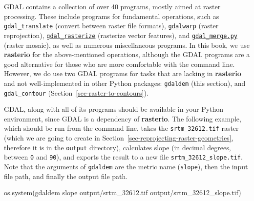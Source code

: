 \documentclass[
  letterpaper,
]{krantz}
\newenvironment{Shaded}{\begin{snugshade}}{\end{snugshade}}
\newcommand{\NormalTok}[1]{\textcolor[rgb]{0.00,0.23,0.31}{#1}}
\newcommand{\StringTok}[1]{\textcolor[rgb]{0.13,0.47,0.30}{#1}}
\begin{document}
\begin{tcolorbox}[enhanced jigsaw, title=\textcolor{quarto-callout-note-color}{\faInfo}\hspace{0.5em}{Note}, arc=.35mm, toprule=.15mm, titlerule=0mm, colframe=quarto-callout-note-color-frame, breakable, toptitle=1mm, bottomtitle=1mm, rightrule=.15mm, colbacktitle=quarto-callout-note-color!10!white, leftrule=.75mm, left=2mm, bottomrule=.15mm, opacityback=0, coltitle=black, opacitybacktitle=0.6, colback=white]

GDAL contains a collection of over 40
\href{https://gdal.org/programs/index.html}{programs}, mostly aimed at
raster processing. These include programs for fundamental operations,
such as
\href{https://gdal.org/programs/gdal_translate.html\#gdal-translate}{\texttt{gdal\_translate}}
(convert between raster file formats),
\href{https://gdal.org/programs/gdalwarp.html\#gdalwarp}{\texttt{gdalwarp}}
(raster reprojection),
\href{https://gdal.org/programs/gdal_rasterize.html\#gdal-rasterize}{\texttt{gdal\_rasterize}}
(rasterize vector features), and
\href{https://gdal.org/programs/gdal_merge.html\#gdal-merge}{\texttt{gdal\_merge.py}}
(raster mosaic), as well as numerous miscellaneous programs. In this
book, we use \textbf{rasterio} for the above-mentioned operations,
although the GDAL programs are a good alternative for those who are more
comfortable with the command line. However, we do use two GDAL programs
for tasks that are lacking in \textbf{rasterio} and not well-implemented
in other Python packages: \texttt{gdaldem} (this section), and
\texttt{gdal\_contour} (Section~\ref{sec-raster-to-contours}).

\end{tcolorbox}

GDAL, along with all of its programs should be available in your Python
environment, since GDAL is a dependency of \textbf{rasterio}. The
following example, which should be run from the command line, takes the
\texttt{srtm\_32612.tif} raster (which we are going to create in
Section~\ref{sec-reprojecting-raster-geometries}, therefore it is in the
\texttt{\textquotesingle{}output\textquotesingle{}} directory),
calculates slope (in decimal degrees, between \texttt{0} and
\texttt{90}), and exports the result to a new file
\texttt{srtm\_32612\_slope.tif}. Note that the arguments of
\texttt{gdaldem} are the metric name (\texttt{slope}), then the input
file path, and finally the output file path.

\begin{Shaded}
\begin{Highlighting}[]
\NormalTok{os.system(}\StringTok{\textquotesingle{}gdaldem slope output/srtm\_32612.tif output/srtm\_32612\_slope.tif\textquotesingle{}}\NormalTok{)}
\end{Highlighting}
\end{Shaded}
\end{document}
